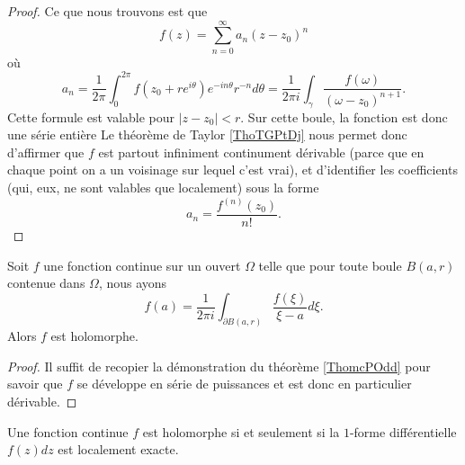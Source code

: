 \begin{proof}
    Ce que nous trouvons est que
    \begin{equation}
        f(z)=\sum_{n=0}^{\infty}a_n(z-z_0)^n
    \end{equation}
    où
    \begin{equation}
        a_n=\frac{1}{ 2\pi }\int_0^{2\pi}f(z_0+r e^{i\theta}) e^{-in\theta}r^{-n}d\theta=\frac{1}{ 2\pi i }\int_{\gamma}\frac{ f(\omega) }{ (\omega-z_0)^{n+1} }.
    \end{equation}
    Cette formule est valable pour \( | z-z_0 |<r\). Sur cette boule, la fonction est donc une série entière Le théorème de Taylor \ref{ThoTGPtDj} nous permet donc d'affirmer que \( f\) est partout infiniment continument dérivable (parce que en chaque point on a un voisinage sur lequel c'est vrai), et d'identifier les coefficients (qui, eux, ne sont valables que localement) sous la forme
    \begin{equation}
        a_n=\frac{ f^{(n)}(z_0) }{ n! }.
    \end{equation}
\end{proof}

\begin{corollary}       \label{CorwfHtJu}
    Soit \( f\) une fonction continue sur un ouvert \( \Omega\) telle que pour toute boule \( B(a,r)\) contenue dans \( \Omega\), nous ayons
    \begin{equation}
        f(a)=\frac{1}{ 2\pi i }\int_{\partial B(a,r)}\frac{ f(\xi) }{ \xi-a }d\xi.
    \end{equation}
    Alors \( f\) est holomorphe.
\end{corollary}

\begin{proof}
    Il suffit de recopier la démonstration du théorème \ref{ThomcPOdd} pour savoir que \( f\) se développe en série de puissances et est donc en particulier dérivable.
\end{proof}

\begin{proposition}\label{PropZOkfmO}
    Une fonction continue \( f\) est holomorphe si et seulement si la \( 1\)-forme différentielle \( f(z)dz\) est localement exacte.
\end{proposition}

